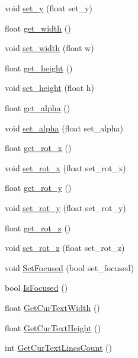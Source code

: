 \begin{DoxyCompactItemize}
void \hyperlink{class_n_g_u_i_symbol_ae538c34fdce6df905ab7f734f02a1a5c}{set\+\_\+y} (float set\+\_\+y)
\item 
float \hyperlink{class_n_g_u_i_symbol_ab7eb07155c75b2d7a75396a2b2935a9a}{get\+\_\+width} ()
\item 
void \hyperlink{class_n_g_u_i_symbol_a1bd2044525f39d1ba9f509c7f297caac}{set\+\_\+width} (float w)
\item 
float \hyperlink{class_n_g_u_i_symbol_af8b1aad25b35a7d8e030fe37f99d556b}{get\+\_\+height} ()
\item 
void \hyperlink{class_n_g_u_i_symbol_a4bc99914cb78ebeb8bf8c25fd543b612}{set\+\_\+height} (float h)
\item 
float \hyperlink{class_n_g_u_i_symbol_a2d0a7a8ee5ea86d5196d9f3af1605562}{get\+\_\+alpha} ()
\item 
void \hyperlink{class_n_g_u_i_symbol_a7e1ed7609a96cc2c13a3e464511b6592}{set\+\_\+alpha} (float set\+\_\+alpha)
\item 
float \hyperlink{class_n_g_u_i_symbol_a87597203d2bb60c6cce8d94be5fde33a}{get\+\_\+rot\+\_\+x} ()
\item 
void \hyperlink{class_n_g_u_i_symbol_a0579ecae747013be5368855c06f5581c}{set\+\_\+rot\+\_\+x} (float set\+\_\+rot\+\_\+x)
\item 
float \hyperlink{class_n_g_u_i_symbol_af2935cbc97f1a6f0a00ad54fdd71354d}{get\+\_\+rot\+\_\+y} ()
\item 
void \hyperlink{class_n_g_u_i_symbol_a00ea39ca48b194add047c80594ebd617}{set\+\_\+rot\+\_\+y} (float set\+\_\+rot\+\_\+y)
\item 
float \hyperlink{class_n_g_u_i_symbol_a1e5abed341b88b9eebcd5382d5ff0fb5}{get\+\_\+rot\+\_\+z} ()
\item 
void \hyperlink{class_n_g_u_i_symbol_ab269b114ac6cf807f4514b72bd01c79b}{set\+\_\+rot\+\_\+z} (float set\+\_\+rot\+\_\+z)
\item 
void \hyperlink{class_n_g_u_i_symbol_a8ab17d1ced7c98c2912792409a307b9e}{Set\+Focused} (bool set\+\_\+focused)
\item 
bool \hyperlink{class_n_g_u_i_symbol_a38e8fc8cb320d799e20feeebd821429b}{Is\+Focused} ()
\item 
float \hyperlink{class_n_g_u_i_symbol_adbf3d31377b8157cfc3756aadf714871}{Get\+Cur\+Text\+Width} ()
\item 
float \hyperlink{class_n_g_u_i_symbol_abbd0c869064777a92d28ffa294d7b93d}{Get\+Cur\+Text\+Height} ()
\item 
int \hyperlink{class_n_g_u_i_symbol_ade52abb51f8dd73a8a7d52d321dddf11}{Get\+Cur\+Text\+Lines\+Count} ()

\end{DoxyCompactItemize}
